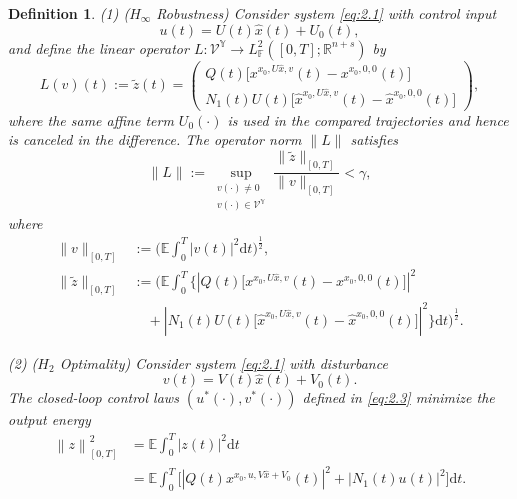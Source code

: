 \documentclass[10pt,a4paper]{amsart}
\newtheorem{defn}{Definition}
\begin{document}
\begin{defn}
	\medskip
	\noindent
	(1) ($H_{\infty}$ Robustness) Consider system \eqref{eq:2.1} with control input
	\[
	u(t)=U(t)\widehat{x}(t)+U_0(t),
	\]
	and define the linear operator $L : \mathcal{V}^{\mathbb{Y}} \rightarrow L_\mathbb{F}^2([0,T];\mathbb{R}^{n + s})$ by
	\[
	L(v)(t) := \widetilde{z}(t) =
	\begin{pmatrix}
		Q(t)\big[x^{x_0,U\widehat{x},v}(t) - x^{x_0,0,0}(t)\big]\\
		N_1(t)U(t)\big[\widehat{x}^{x_0,U\widehat{x},v}(t) - \widehat{x}^{x_0,0,0}(t)\big]
	\end{pmatrix},
	\]
	where the same affine term $U_0(\cdot)$ is used in the compared trajectories and hence is canceled in the difference. The operator norm $\|L\|$ satisfies
	\begin{equation*}
		\|L\| := \sup_{\substack{v(\cdot) \neq 0 \\ v(\cdot) \in \mathcal{V}^{\mathbb{Y}}}} \frac{\|\widetilde{z}\|_{[0,T]}}{\|v\|_{[0,T]}} < \gamma,
	\end{equation*}
	where
	\begin{equation*}
		\begin{aligned}
			\|v\|_{[0,T]} &:= \Big(\mathbb{E}\int_0^T |v(t)|^2 \mathrm{d}t\Big)^{\frac{1}{2}},\\
			\|\widetilde{z}\|_{[0,T]} &:= \Bigg(\mathbb{E}\int_0^T \Big\{|Q(t)\big[x^{x_0,U\widehat{x},v}(t) - x^{x_0,0,0}(t)\big]|^2 \\
			&\quad + |N_1(t)U(t)\big[\widehat{x}^{x_0,U\widehat{x},v}(t) - \widehat{x}^{x_0,0,0}(t)\big]|^2 \Big\} \mathrm{d}t \Bigg)^{\frac{1}{2}}.
		\end{aligned}
	\end{equation*}
	
	\medskip
	\noindent
	(2) ($H_2$ Optimality) Consider system \eqref{eq:2.1} with disturbance
	\[
	v(t) = V(t)\widehat{x}(t) + V_0(t).
	\]
	The closed-loop control laws $(u^*(\cdot),v^*(\cdot))$ defined in \eqref{eq:2.3} minimize the output energy
	\begin{equation*}
		\begin{aligned}
			\left\|z\right\|^2_{[0,T]}
			&= \mathbb{E}\int_{0}^{T} |z(t)|^2 \mathrm{d}t\\
			&= \mathbb{E}\int_{0}^{T} \Big[|Q(t)x^{x_0,u,V\widehat{x}+V_0}(t)|^2 + |N_1(t)u(t)|^2\Big] \mathrm{d}t.
		\end{aligned}
	\end{equation*}
\end{defn}
\end{document}
